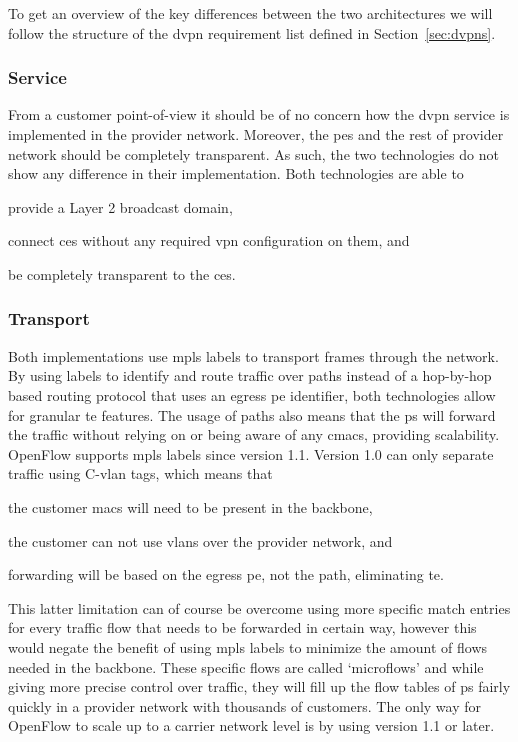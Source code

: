 To get an overview of the key differences between the two architectures we will follow the structure of the \ac{dvpn} requirement list defined in Section~\ref{sec:dvpns}. 

\subsubsection{Service} %
\label{ssub:service}

From a customer point-of-view it should be of no concern how the \ac{dvpn} service is implemented in the provider network. Moreover, the \acp{pe} and the rest of provider network should be completely transparent. As such, the two technologies do not show any difference in their implementation. Both technologies are able to 
\begin{inparaenum}[\itshape 1\upshape)]
	\item provide a Layer 2 broadcast domain,
	\item connect \acp{ce} without any required \ac{vpn} configuration on them, and
	\item be completely transparent to the \acp{ce}.
\end{inparaenum}


\subsubsection{Transport} %
\label{ssub:transport}

Both implementations use \ac{mpls} labels to transport frames through the network. By using labels to identify and route traffic over paths instead of a hop-by-hop based routing protocol that uses an egress \ac{pe} identifier, both technologies allow for granular \ac{te} features.   The usage of paths also means that the \acp{p} will forward the traffic without relying on or being aware of any \acp{cmac}, providing scalability. OpenFlow supports \ac{mpls} labels since version 1.1. Version 1.0 can only separate traffic using C-\ac{vlan} tags, which means that 
\begin{inparaenum}
	\item the customer \acp{mac} will need to be present in the backbone, 
	\item the customer can not use \acp{vlan} over the provider network, and
	\item forwarding will be based on the egress \ac{pe}, not the path, eliminating \ac{te}.
\end{inparaenum}
This latter limitation can of course be overcome using more specific match entries for every traffic flow that needs to be forwarded in certain way, however this would negate the benefit of using \ac{mpls} labels to minimize the amount of flows needed in the backbone. These specific flows are called `microflows' and while giving more precise control over traffic, they will fill up the flow tables of \acp{p} fairly quickly in a provider network with thousands of customers. The only way for OpenFlow to scale up to a carrier network level is by using version 1.1 or later.

